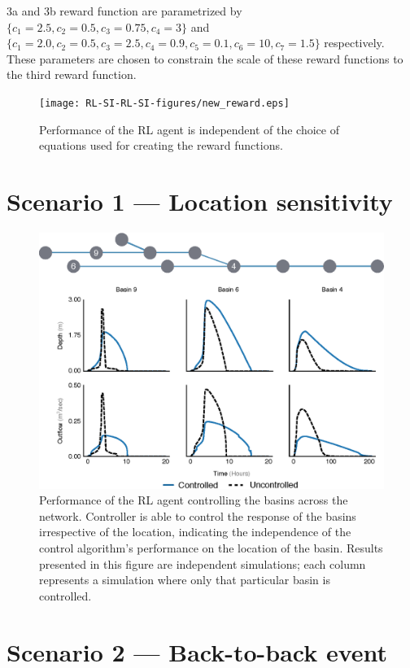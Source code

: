3a and 3b reward function are parametrized by $\{ c_1 = 2.5, c_2 = 0.5, c_3 = 0.75, c_4=3\}$ and $\{c_1 =2.0, c_2 = 0.5, c_3 = 2.5, c_4 = 0.9, c_5=0.1, c_6=10, c_7 = 1.5\}$ respectively.
These parameters are chosen to constrain the scale of these reward functions to the third reward function.

\begin{figure}[H]
    \centering
    \texttt{[image: RL-SI-RL-SI-figures/new\_reward.eps]}
    \caption{Performance of the RL agent is independent of the choice of equations used for creating the reward functions.}\label{fig:new_reward_math}
\end{figure}

\newpage 

\section{Scenario 1 --- Location sensitivity}\label{SI:reward-loc}
\begin{figure}[ht]
    \centering
    \includegraphics[width=\linewidth]{RL-SI-figures/location_senstiv.eps}
    \caption{Performance of the RL agent controlling the basins across the network. Controller is able to control the response of the basins irrespective of the location, indicating the independence of the control algorithm's performance on the location of the basin. Results presented in this figure are independent simulations; each column represents a simulation where only that particular basin is controlled.}\label{fig:9}
\end{figure}

\section{Scenario 2 --- Back-to-back event}\label{SI:b2b-events}

